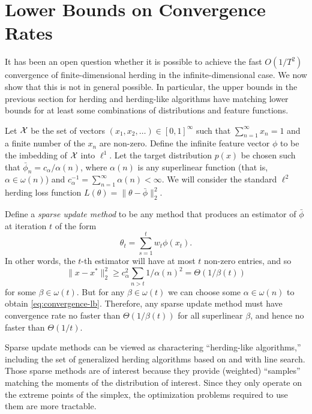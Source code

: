 \documentclass[paper.tex]{subfiles}
\begin{document}
\section{Lower Bounds on Convergence Rates}
\label{sec:lower-bounds}

It has been an open question whether it is possible to achieve the fast $O(1/T^{2})$ convergence of finite-dimensional herding in the infinite-dimensional case. We now show that this is not in general possible. In particular, the upper bounds in the previous section for herding and herding-like algorithms have matching lower bounds for at least some combinations of distributions and feature functions. 

Let $\mathcal{X}$ be the set of vectors $(x_{1},x_{2},\dots) \in [0,1]^{\infty}$ such that $\sum_{n=1}^{\infty} x_{n} = 1$ and a finite number of the $x_{n}$ are non-zero. Define the infinite feature vector $\phi$ to be the imbedding of $\mathcal{X}$ into $\ell^{1}$. Let the target distribution $p(x)$ be chosen such that $\bar\phi_{n} = c_{\alpha}/\alpha(n)$, where $\alpha(n)$ is any superlinear function (that is, $\alpha \in \omega(n)$) and $c_{\alpha}^{-1} = \sum_{n=1}^{\infty} \alpha(n) < \infty$. We will consider the standard $\ell^{2}$ herding loss function $L(\theta) = \|\theta - \bar \phi\|_2^2$. 

Define a {\em sparse update method} to be any method that produces an estimator of $\bar \phi$ at iteration $t$ of the form 
\[
\theta_{t} = \sum_{s =1}^{t}w_{t} \phi(x_{t}).
\]
In other words, the $t$-th estimator will have at most $t$ non-zero entries, and so 
\[
\|x-x^{*}\|_2^2 \ge c_{\alpha}^{2}\sum_{n > t} 1/\alpha(n)^{2} = \Theta(1/\beta(t)) \label{eq:convergence-lb}
\]
for some $\beta \in \omega(t)$. But for any $\beta \in \omega(t)$ we can choose some $\alpha \in \omega(n)$ to obtain \eqref{eq:convergence-lb}. Therefore, any sparse update method must have convergence rate no faster than $\Theta(1/\beta(t))$ for all superlinear $\beta$, and hence no faster than $\Theta(1/t)$. 

Sparse update methods can be viewed as charactering ``herding-like algorithms,'' including the set of generalized herding algorithms based on \dual and \cgd with line search. Those sparse methods are of interest because they provide (weighted) ``samples'' matching the moments of the distribution of interest. Since they only operate on the extreme points of the simplex, the optimization problems required to use them are more tractable. 

\end{document}
